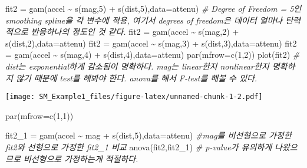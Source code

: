 \documentclass[
]{article}
\newenvironment{Shaded}{\begin{snugshade}}{\end{snugshade}}
\newcommand{\AttributeTok}[1]{\textcolor[rgb]{0.77,0.63,0.00}{#1}}
\newcommand{\CommentTok}[1]{\textcolor[rgb]{0.56,0.35,0.01}{\textit{#1}}}
\newcommand{\DecValTok}[1]{\textcolor[rgb]{0.00,0.00,0.81}{#1}}
\newcommand{\FunctionTok}[1]{\textcolor[rgb]{0.00,0.00,0.00}{#1}}
\newcommand{\NormalTok}[1]{#1}
\newcommand{\OtherTok}[1]{\textcolor[rgb]{0.56,0.35,0.01}{#1}}
\newcommand{\SpecialCharTok}[1]{\textcolor[rgb]{0.00,0.00,0.00}{#1}}
\begin{document}
\begin{Shaded}
\begin{Highlighting}[]
\NormalTok{fit2 }\OtherTok{=} \FunctionTok{gam}\NormalTok{(accel }\SpecialCharTok{\textasciitilde{}} \FunctionTok{s}\NormalTok{(mag,}\DecValTok{5}\NormalTok{) }\SpecialCharTok{+} \FunctionTok{s}\NormalTok{(dist,}\DecValTok{5}\NormalTok{),}\AttributeTok{data=}\NormalTok{attenu) }\CommentTok{\# Degree of Freedom = 5인 smoothing spline을 각 변수에 적용, 여기서 degrees of freedom은 데이터 얼마나 탄력적으로 반응하나의 정도인 것 같다. }
\NormalTok{fit2 }\OtherTok{=} \FunctionTok{gam}\NormalTok{(accel }\SpecialCharTok{\textasciitilde{}} \FunctionTok{s}\NormalTok{(mag,}\DecValTok{2}\NormalTok{) }\SpecialCharTok{+} \FunctionTok{s}\NormalTok{(dist,}\DecValTok{2}\NormalTok{),}\AttributeTok{data=}\NormalTok{attenu)}
\NormalTok{fit2 }\OtherTok{=} \FunctionTok{gam}\NormalTok{(accel }\SpecialCharTok{\textasciitilde{}} \FunctionTok{s}\NormalTok{(mag,}\DecValTok{3}\NormalTok{) }\SpecialCharTok{+} \FunctionTok{s}\NormalTok{(dist,}\DecValTok{3}\NormalTok{),}\AttributeTok{data=}\NormalTok{attenu)}
\NormalTok{fit2 }\OtherTok{=} \FunctionTok{gam}\NormalTok{(accel }\SpecialCharTok{\textasciitilde{}} \FunctionTok{s}\NormalTok{(mag,}\DecValTok{4}\NormalTok{) }\SpecialCharTok{+} \FunctionTok{s}\NormalTok{(dist,}\DecValTok{4}\NormalTok{),}\AttributeTok{data=}\NormalTok{attenu)}
\FunctionTok{par}\NormalTok{(}\AttributeTok{mfrow=}\FunctionTok{c}\NormalTok{(}\DecValTok{1}\NormalTok{,}\DecValTok{2}\NormalTok{))}
\FunctionTok{plot}\NormalTok{(fit2) }\CommentTok{\# dist는 exponential하게 감소됨이 명확하다. mag는 linear한지 nonlinear한지 명확하지 않기 때문에 test를 해봐야 한다. anova를 해서 F{-}test를 해볼 수 있다. }
\end{Highlighting}
\end{Shaded}

\texttt{[image: SM\_Example1\_files/figure-latex/unnamed-chunk-1-2.pdf]}

\begin{Shaded}
\begin{Highlighting}[]
\FunctionTok{par}\NormalTok{(}\AttributeTok{mfrow=}\FunctionTok{c}\NormalTok{(}\DecValTok{1}\NormalTok{,}\DecValTok{1}\NormalTok{))}

\NormalTok{fit2\_1 }\OtherTok{=} \FunctionTok{gam}\NormalTok{(accel }\SpecialCharTok{\textasciitilde{}}\NormalTok{ mag }\SpecialCharTok{+} \FunctionTok{s}\NormalTok{(dist,}\DecValTok{5}\NormalTok{),}\AttributeTok{data=}\NormalTok{attenu) }\CommentTok{\#mag를 비선형으로 가정한 fit2와 선형으로 가정한 fit2\_1 비교}
\FunctionTok{anova}\NormalTok{(fit2,fit2\_1) }\CommentTok{\# p{-}value가 유의하게 나왔으므로 비선형으로 가정하는게 적절하다.}
\end{Highlighting}
\end{Shaded}
\end{document}
